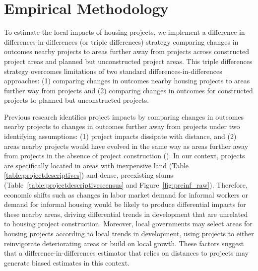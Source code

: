 \documentclass[12pt]{article}
\begin{document}
\section{Empirical Methodology}\label{section:methodology}


To estimate the local impacts of housing projects, we implement a difference-in-differences-in-differences (or triple differences) strategy comparing changes in outcomes nearby projects to areas further away from projects across constructed project areas and planned but unconstructed project areas.  This triple differences strategy overcomes limitations of two standard differences-in-differences approaches: (1) comparing changes in outcomes nearby housing projects to areas further way from projects and (2) comparing changes in outcomes for constructed projects to planned but unconstructed projects.

Previous research identifies project impacts by comparing changes in outcomes nearby projects to changes in outcomes further away from projects under two identifying assumptions: (1) project impacts dissipate with distance, and (2) areas nearby projects would have evolved in the same way as areas further away from projects in the absence of project construction (\cite{diamond2016wants,harari2018slum}).  In our context, projects are specifically located in areas with inexpensive land (Table \ref{table:projectdescriptives}) and dense, preexisting slums (Table~\ref{table:projectdescriptivescensus} and Figure~\ref{fig:preinf_raw}).  Therefore, economic shifts such as changes in labor market demand for informal workers or demand for informal housing would be likely to produce differential impacts for these nearby areas, driving differential trends in development that are unrelated to housing project construction.  Moreover, local governments may select areas for housing projects according to local trends in development, using projects to either reinvigorate deteriorating areas or build on local growth.  These factors suggest that a difference-in-differences estimator that relies on distances to projects may generate biased estimates in this context.
\end{document}

